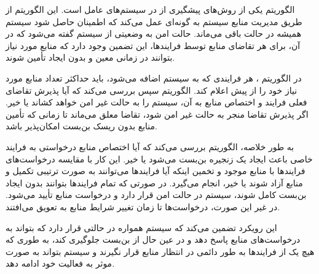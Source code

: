 الگوریتم 
یکی از روش‌های پیشگیری از 
در سیستم‌های عامل است. این الگوریتم از طریق مدیریت منابع سیستم به گونه‌ای عمل می‌کند که اطمینان حاصل شود سیستم همیشه در حالت
باقی می‌ماند. حالت امن به وضعیتی از سیستم گفته می‌شود که در آن، برای هر تقاضای منابع توسط فرایندها، این تضمین وجود دارد که منابع مورد نیاز بتوانند در زمانی معین و بدون ایجاد 
تأمین شوند.

در الگوریتم 
، هر فرایندی که به سیستم اضافه می‌شود، باید حداکثر تعداد منابع مورد نیاز خود را از پیش اعلام کند. الگوریتم سپس بررسی می‌کند که آیا پذیرش تقاضای فعلی فرایند و اختصاص منابع به آن، سیستم را به حالت غیر امن خواهد کشاند یا خیر. اگر پذیرش تقاضا منجر به حالت غیر امن شود، تقاضا معلق می‌ماند تا زمانی که تأمین منابع بدون ریسک بن‌بست امکان‌پذیر باشد.

به طور خلاصه، الگوریتم 
بررسی می‌کند که آیا اختصاص منابع درخواستی به فرایند خاصی باعث ایجاد یک زنجیره بن‌بست می‌شود یا خیر. این کار با مقایسه درخواست‌های فرایندها با منابع موجود و تخمین اینکه آیا فرایندها می‌توانند به صورت ترتیبی تکمیل و منابع آزاد شوند یا خیر، انجام می‌گیرد. در صورتی که تمام فرایندها بتوانند بدون ایجاد بن‌بست کامل شوند، سیستم در حالت امن قرار دارد و درخواست منابع تأیید می‌شود. در غیر این صورت، درخواست‌ها تا زمان تغییر شرایط منابع به تعویق می‌افتند.

این رویکرد تضمین می‌کند که سیستم همواره در حالتی قرار دارد که بتواند به درخواست‌های منابع پاسخ دهد و در عین حال از بن‌بست جلوگیری کند، به طوری که هیچ یک از فرایندها به طور دائمی در انتظار منابع قرار نگیرند و سیستم بتواند به صورت موثر به فعالیت خود ادامه دهد.












